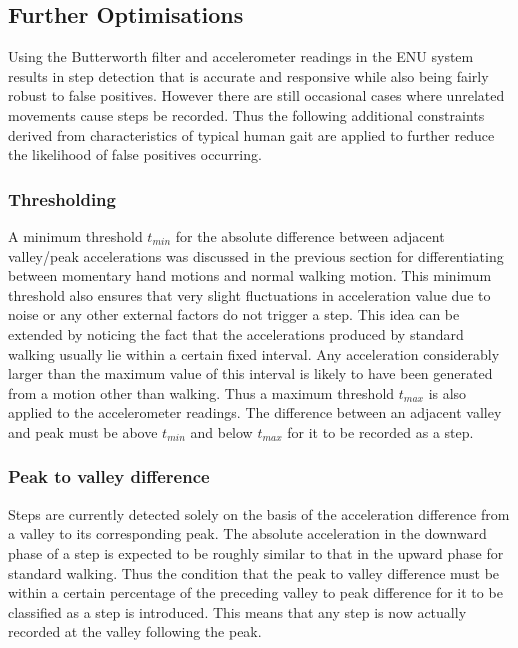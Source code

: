 \documentclass[12pt,a4paper]{report}
\begin{document}
\subsection{Further Optimisations}

Using the Butterworth filter and accelerometer readings in the ENU system results in step detection that is accurate and responsive while also being fairly robust to false positives. However there are still occasional cases where unrelated movements cause steps be recorded. Thus the following additional constraints derived from characteristics of typical human gait are applied to further reduce the likelihood of false positives occurring.  

\subsubsection{Thresholding}

A minimum threshold $t_{min}$ for the absolute difference between adjacent valley/peak accelerations was discussed in the previous section for differentiating between momentary hand motions and normal walking motion. This minimum threshold also ensures that very slight fluctuations in acceleration value due to noise or any other external factors do not trigger a step. This idea can be extended by noticing the fact that the accelerations produced by standard walking usually lie within a certain fixed interval. Any acceleration considerably larger than the maximum value of this interval is likely to have been generated from a motion other than walking. Thus a maximum threshold $t_{max}$ is also applied to the accelerometer readings. The difference between an adjacent valley and peak must be above $t_{min}$ and below $t_{max}$ for it to be recorded as a step. 

\subsubsection{Peak to valley difference}

Steps are currently detected solely on the basis of the acceleration difference from a valley to its corresponding peak. The absolute acceleration in the downward phase of a step is expected to be roughly similar to that in the upward phase for standard walking. Thus the condition that the peak to valley difference must be within a certain percentage of the preceding valley to peak difference for it to be classified as a step is introduced. This means that any step is now actually recorded at the valley following the peak.   
\end{document}
